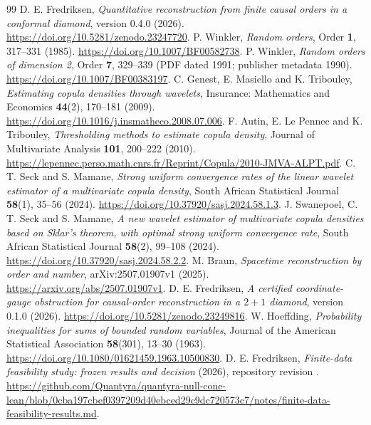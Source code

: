 \documentclass[11pt]{article}
\theoremstyle{remark}
\begin{document}
\begin{thebibliography}{99}
 D. E. Fredriksen,
\emph{Quantitative reconstruction from finite causal orders in a conformal
diamond}, version 0.4.0 (2026).
\url{https://doi.org/10.5281/zenodo.23247720}.
 P. Winkler, \emph{Random orders},
Order \textbf{1}, 317--331 (1985).
\url{https://doi.org/10.1007/BF00582738}.
 P. Winkler, \emph{Random orders of dimension 2},
Order \textbf{7}, 329--339 (PDF dated 1991; publisher metadata 1990).
\url{https://doi.org/10.1007/BF00383197}.
 C. Genest, E. Masiello and K. Tribouley,
\emph{Estimating copula densities through wavelets},
Insurance: Mathematics and Economics \textbf{44}(2), 170--181 (2009).
\url{https://doi.org/10.1016/j.insmatheco.2008.07.006}.
 F. Autin, E. Le Pennec and K. Tribouley,
\emph{Thresholding methods to estimate copula density},
Journal of Multivariate Analysis \textbf{101}, 200--222 (2010).
\url{https://lepennec.perso.math.cnrs.fr/Reprint/Copula/2010-JMVA-ALPT.pdf}.
 C. T. Seck and S. Mamane,
\emph{Strong uniform convergence rates of the linear wavelet estimator
of a multivariate copula density}, South African Statistical Journal
\textbf{58}(1), 35--56 (2024).
\url{https://doi.org/10.37920/sasj.2024.58.1.3}.
 J. Swanepoel, C. T. Seck and S. Mamane,
\emph{A new wavelet estimator of multivariate copula densities based on
Sklar's theorem, with optimal strong uniform convergence rate},
South African Statistical Journal \textbf{58}(2), 99--108 (2024).
\url{https://doi.org/10.37920/sasj.2024.58.2.2}.
 M. Braun, \emph{Spacetime reconstruction by order and
number}, arXiv:2507.01907v1 (2025).
\url{https://arxiv.org/abs/2507.01907v1}.
 D. E. Fredriksen,
\emph{A certified coordinate-gauge obstruction for causal-order
reconstruction in a $2+1$ diamond}, version 0.1.0 (2026).
\url{https://doi.org/10.5281/zenodo.23249816}.
 W. Hoeffding,
\emph{Probability inequalities for sums of bounded random variables},
Journal of the American Statistical Association \textbf{58}(301),
13--30 (1963).
\url{https://doi.org/10.1080/01621459.1963.10500830}.
 D. E. Fredriksen, \emph{Finite-data feasibility study:
frozen results and decision} (2026), repository revision
.
\url{https://github.com/Quantyra/quantyra-null-cone-lean/blob/0cba197cbef0397209d40ebced29c9dc720573c7/notes/finite-data-feasibility-results.md}.
\end{thebibliography}
\end{document}

